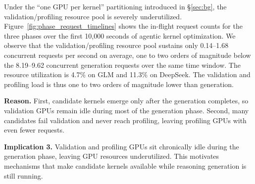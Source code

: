 Under the ``one GPU per kernel'' partitioning introduced in \S\ref{sec:bg}, the validation/profiling resource pool is severely underutilized.
Figure~\ref{fig:phase_request_timelines} shows the in-flight request counts for the three phases over the first 10{,}000 seconds of agentic kernel optimization.
We observe that the validation/profiling resource pool sustains only 0.14--1.68 concurrent requests per second on average, one to two orders of magnitude below the 8.19--9.62 concurrent generation requests over the same time window.
The resource utilization is 4.7\% on GLM and 11.3\% on DeepSeek.
The validation and profiling load is thus one to two orders of magnitude lower than generation.

\noindent\textbf{Reason.}
First, candidate kernels emerge only after the generation completes, so validation
GPUs remain idle during most of the generation phase.
Second, many candidates fail validation and never reach profiling, leaving
profiling GPUs with even fewer requests.

\noindent\textbf{Implication 3.} Validation and profiling GPUs sit chronically idle during the generation phase, 
leaving GPU resources underutilized. This motivates mechanisms that make candidate kernels available while reasoning
generation is still running.
